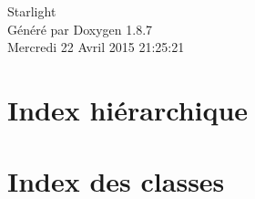 \documentclass[twoside]{book}
\newcommand{\+}{\discretionary{\mbox{\scriptsize$\hookleftarrow$}}{}{}}
\newcommand{\clearemptydoublepage}{%
  \newpage{\pagestyle{empty}\cleardoublepage}%
}
\begin{document}
\hypersetup{pageanchor=false,
             bookmarks=true,
             bookmarksnumbered=true,
             pdfencoding=unicode
            }
\begin{titlepage}
\vspace*{7cm}
\begin{center}%
{\Large Starlight }\\
\vspace*{1cm}
{\large Généré par Doxygen 1.8.7}\\
\vspace*{0.5cm}
{\small Mercredi 22 Avril 2015 21:25:21}\\
\end{center}
\end{titlepage}
\clearemptydoublepage
\tableofcontents
\clearemptydoublepage
{}
\hypersetup{pageanchor=true}

\chapter{Index hiérarchique}

\chapter{Index des classes}

\end{document}
